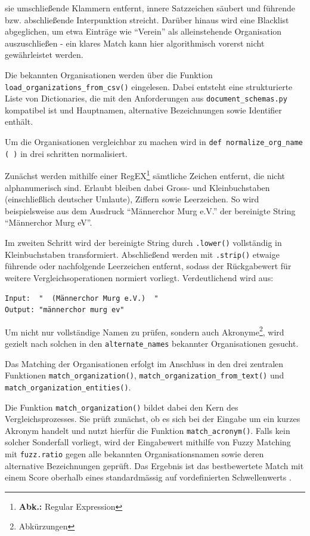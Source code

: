 \documentclass[12pt, a4paper, ngerman, bidi=default]{article}
\newcommand{\code}[1]{\colorbox{VeryLightGray}{\texttt{#1}}} %
\begin{document}
sie umschließende Klammern entfernt, innere Satzzeichen säubert und führende bzw. abschließende Interpunktion streicht. Darüber hinaus wird eine Blacklist abgeglichen, um etwa Einträge wie \enquote{Verein} als alleinstehende Organisation auszuschließen - ein klares Match kann hier algorithmisch vorerst nicht gewährleistet werden.

Die bekannten Organisationen werden über die Funktion \code{load\_organizations\_from\_csv()} eingelesen. Dabei entsteht eine strukturierte Liste von Dictionaries, die mit den Anforderungen aus \code{document\_schemas.py} kompatibel ist und Hauptnamen, alternative Bezeichnungen sowie Identifier enthält.

Um die Organisationen vergleichbar zu machen wird in \code{def normalize\_org\_name ( )} in drei schritten normalisiert.

Zunächst werden mithilfe einer RegEX\footnote{\textbf{Abk.:} Regular Expression} sämtliche Zeichen entfernt, die nicht alphanumerisch sind. Erlaubt bleiben dabei Gross- und Kleinbuchstaben (einschließlich deutscher Umlaute), Ziffern sowie Leerzeichen. So wird beispielsweise aus dem Ausdruck \enquote{Männerchor Murg e.V.} der bereinigte String \enquote{Männerchor Murg eV}.

Im zweiten Schritt wird der bereinigte String durch \code{.lower()} vollständig in Kleinbuchstaben transformiert.
Abschließend werden mit \code{.strip()} etwaige führende oder nachfolgende Leerzeichen entfernt, sodass der Rückgabewert für weitere Vergleichsoperationen normiert vorliegt. Verdeutlichend wird aus:
\begin{verbatim}
Input:  "  (Männerchor Murg e.V.)  "
Output: "männerchor murg ev"
\end{verbatim}
Um nicht nur vollständige Namen zu prüfen, sondern auch Akronyme\footnote{Abkürzungen}, wird gezielt nach solchen in den \texttt{alternate\_names} bekannter Organisationen gesucht.
 
Das Matching der Organisationen erfolgt im Anschluss in den drei zentralen Funktionen \code{match\_organization()}, \code{match\_organization\_from\_text()} und \code{match\_organization\_entities()}.

Die Funktion \code{match\_organization()} bildet dabei den Kern des Vergleichsprozesses. Sie prüft zunächst, ob es sich bei der Eingabe um ein kurzes Akronym handelt und nutzt hierfür die Funktion \code{match\_acronym()}. Falls kein solcher Sonderfall vorliegt, wird der Eingabewert mithilfe von Fuzzy Matching mit \code{fuzz.ratio} gegen alle bekannten Organisationsnamen sowie deren alternative Bezeichnungen geprüft. Das Ergebnis ist das bestbewertete Match mit einem Score oberhalb eines standardmässig auf vordefinierten Schwellenwerts .
\end{document}
